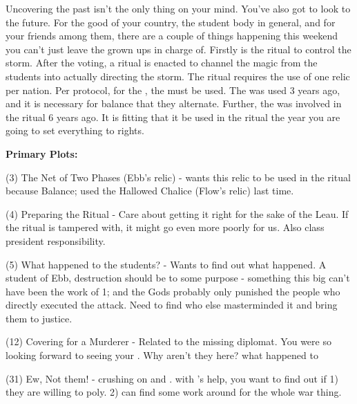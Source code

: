 \documentclass[char]{GL2020}
\begin{document}
Uncovering the past isn't the only thing on your mind. You've also got to look to the future. For the good of your country, the student body in general, and for your friends among them, there are a couple of things happening this weekend you can't just leave the grown ups in charge of. Firstly is the ritual to control the storm. After the voting, a ritual is enacted to channel the magic from the students into actually directing the storm. The ritual requires the use of one relic per nation. Per protocol, for the \pShip{}, the \iNet{} must be used. The \iChalice{} was used 3 years ago, and it is necessary for balance that they alternate. Further, the \iNet{} was involved in the ritual 6 years ago. It is fitting that it be used in the ritual the year you are going to set everything to rights.




\textbf{Primary Plots:}

(3) The Net of Two Phases (Ebb's relic)  - wants this relic to be used in the ritual because Balance; used the Hallowed Chalice (Flow's relic) last time.

(4) Preparing the Ritual - Care about getting it right for the sake of the Leau. If the ritual is tampered with, it might go even more poorly for us. Also class president responsibility.

(5) What happened to the students? - Wants to find out what happened. A student of Ebb, destruction should be to some purpose - something this big can’t have been the work of 1; and the Gods probably only punished the people who directly executed the attack. Need to find who else masterminded it and bring them to justice.

(12) Covering for a Murderer - Related to the missing diplomat. You were so looking forward to seeing your \cHeadDiplomat{\auncle}. Why aren't they here? what happened to \cHeadDiplomat{\them}

(31) Ew, Not them! - crushing on \cHeir{} and \cChupStudent{}. with \cInitiate{}'s help, you want to find out if 1) they are willing to poly. 2) can find some work around for the whole war thing.
\end{document}
